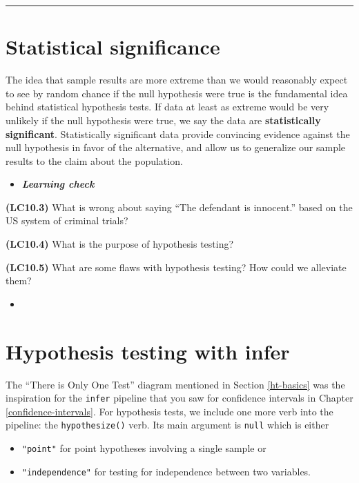 \documentclass[12pt,]{krantz}
\providecommand{\tightlist}{%
  \setlength{\itemsep}{0pt}\setlength{\parskip}{0pt}}
\newenvironment{rmdblock}[1]
  {\begin{shaded*}
  \begin{itemize}
  \renewcommand{\labelitemi}{
    \raisebox{-.7\height}[0pt][0pt]{
    }
  }
  \item
  }
  {
  \end{itemize}
  \end{shaded*}
  }
\newenvironment{learncheck}
  {\begin{rmdblock}{warning}}
  {\end{rmdblock}}
\begin{document}
\begin{center}\rule{0.5\linewidth}{\linethickness}\end{center}

\section{Statistical significance}\label{statistical-significance}

The idea that sample results are more extreme than we would reasonably
expect to see by random chance if the null hypothesis were true is the
fundamental idea behind statistical hypothesis tests. If data at least
as extreme would be very unlikely if the null hypothesis were true, we
say the data are \textbf{statistically significant}. Statistically
significant data provide convincing evidence against the null hypothesis
in favor of the alternative, and allow us to generalize our sample
results to the claim about the population.

\begin{learncheck}
\textbf{\emph{Learning check}}
\end{learncheck}

\textbf{(LC10.3)} What is wrong about saying ``The defendant is
innocent.'' based on the US system of criminal trials?

\textbf{(LC10.4)} What is the purpose of hypothesis testing?

\textbf{(LC10.5)} What are some flaws with hypothesis testing? How could
we alleviate them?

\begin{learncheck}

\end{learncheck}

\section{Hypothesis testing with
infer}\label{hypothesis-testing-with-infer}

The ``There is Only One Test'' diagram mentioned in Section
\ref{ht-basics} was the inspiration for the \texttt{infer} pipeline that
you saw for confidence intervals in Chapter \ref{confidence-intervals}.
For hypothesis tests, we include one more verb into the pipeline: the
\texttt{hypothesize()} verb. Its main argument is \texttt{null} which is
either

\begin{itemize}
\tightlist
\item
  \texttt{"point"} for point hypotheses involving a single sample or
\item
  \texttt{"independence"} for testing for independence between two
  variables.
\end{itemize}
\end{document}
